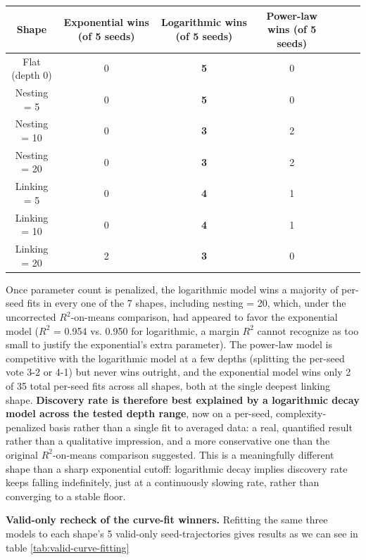 \documentclass[]{article}
\begin{document}
        \begin{table}[]
            \centering
            \begin{tabularx}{\linewidth}{C C C C C C C}
                \hline
                Shape & Exponential wins (of 5 seeds) & Logarithmic wins (of 5 seeds) & Power-law wins (of 5 seeds) \\
                \hline
                Flat (depth 0) & 0 & \textbf{5} & 0 \\
                Nesting = 5 & 0 & \textbf{5} & 0 \\
                Nesting = 10 & 0 & \textbf{3} & 2 \\
                Nesting = 20 & 0 & \textbf{3} & 2 \\
                Linking = 5 & 0 & \textbf{4} & 1 \\
                Linking = 10 & 0 & \textbf{4} & 1 \\
                Linking = 20 & 2 & \textbf{3} & 0 \\
                \hline
            \end{tabularx}
            \label{tab:curve-fitting}
        \end{table}

        Once parameter count is penalized, the logarithmic model wins a majority of per-seed fits in every one of the 7 shapes, including nesting = 20, which, under the uncorrected $R^2$-on-means comparison, had appeared to favor the exponential model ($R^2$ = 0.954 vs. 0.950 for logarithmic, a margin $R^2$ cannot recognize as too small to justify the exponential's extra parameter). The power-law model is competitive with the logarithmic model at a few depths (splitting the per-seed vote 3-2 or 4-1) but never wins outright, and the exponential model wins only 2 of 35 total per-seed fits across all shapes, both at the single deepest linking shape. \textbf{Discovery rate is therefore best explained by a logarithmic decay model across the tested depth range}, now on a per-seed, complexity-penalized basis rather than a single fit to averaged data: a real, quantified result rather than a qualitative impression, and a more conservative one than the original $R^2$-on-means comparison suggested. This is a meaningfully different shape than a sharp exponential cutoff: logarithmic decay implies discovery rate keeps falling indefinitely, just at a continuously slowing rate, rather than converging to a stable floor.

        \textbf{Valid-only recheck of the curve-fit winners.} Refitting the same three models to each shape's 5 valid-only seed-trajectories gives results as we can see in table \ref{tab:valid-curve-fitting}
\end{document}
